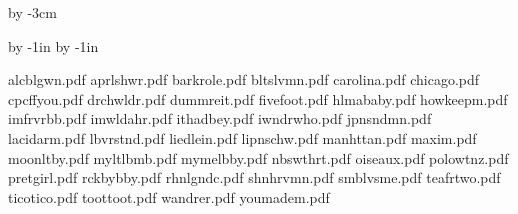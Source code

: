 



\enablehyperlinks[dvipdfm]



\hsize=210mm
\vsize=297mm

\parindent=0pt

\advance\vsize by -3cm

\advance\voffset by -1in
\advance\hoffset by -1in



\def\epsfsize#1#2{#1}

\begingroup
\obeylines
\href{https://github.com/lfinston/Songlist/blob/main/lead_sheets/alcblgwn.pdf}{}
\href{https://github.com/lfinston/Songlist/blob/main/lead_sheets/aprlshwr.pdf}{}
\endgroup


\bye


alcblgwn.pdf
aprlshwr.pdf
barkrole.pdf
bltslvmn.pdf
carolina.pdf
chicago.pdf
cpcffyou.pdf
drchwldr.pdf
dummreit.pdf
fivefoot.pdf
hlmababy.pdf
howkeepm.pdf
imfrvrbb.pdf
imwldahr.pdf
ithadbey.pdf
iwndrwho.pdf
jpnsndmn.pdf
lacidarm.pdf
lbvrstnd.pdf
liedlein.pdf
lipnschw.pdf
manhttan.pdf
maxim.pdf
moonltby.pdf
myltlbmb.pdf
mymelbby.pdf
nbswthrt.pdf
oiseaux.pdf
polowtnz.pdf
pretgirl.pdf
rckbybby.pdf
rhnlgndc.pdf
shnhrvmn.pdf
smblvsme.pdf
teafrtwo.pdf
ticotico.pdf
toottoot.pdf
wandrer.pdf
youmadem.pdf


\bye


